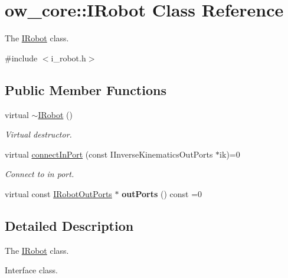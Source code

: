 \hypertarget{classow__core_1_1IRobot}{}\section{ow\+\_\+core\+:\+:I\+Robot Class Reference}
\label{classow__core_1_1IRobot}


The \hyperlink{classow__core_1_1IRobot}{I\+Robot} class.  




{\ttfamily \#include $<$i\+\_\+robot.\+h$>$}

\subsection*{Public Member Functions}
\begin{DoxyCompactItemize}
\item 
virtual \hyperlink{classow__core_1_1IRobot_a22760209db12499291efb200e906ed3c}{$\sim$\+I\+Robot} ()\hypertarget{classow__core_1_1IRobot_a22760209db12499291efb200e906ed3c}{}\label{classow__core_1_1IRobot_a22760209db12499291efb200e906ed3c}

\begin{DoxyCompactList}\small\item\em Virtual destructor. \end{DoxyCompactList}\item 
virtual \hyperlink{classow__core_1_1IRobot_a9bdff9f15015cda18554c4dddf728928}{connect\+In\+Port} (const I\+Inverse\+Kinematics\+Out\+Ports $\ast$ik)=0
\begin{DoxyCompactList}\small\item\em Connect to in port. \end{DoxyCompactList}\item 
virtual const \hyperlink{classow__core_1_1IRobotOutPorts}{I\+Robot\+Out\+Ports} $\ast$ {\bfseries out\+Ports} () const =0\hypertarget{classow__core_1_1IRobot_a50f7cf4bb874717667bd03d3bdac7c80}{}\label{classow__core_1_1IRobot_a50f7cf4bb874717667bd03d3bdac7c80}

\end{DoxyCompactItemize}


\subsection{Detailed Description}
The \hyperlink{classow__core_1_1IRobot}{I\+Robot} class. 

Interface class.

